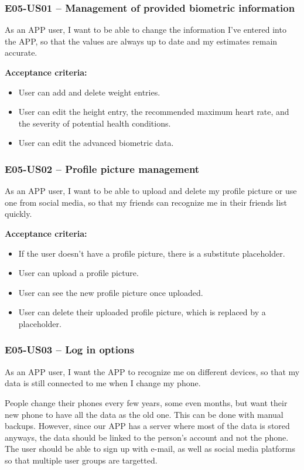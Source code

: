\subsubsection*{E05-US01 -- Management of provided biometric information}
As an APP user, I want to be able to change the information I've entered into the APP, so that the values are always up to date and my estimates remain accurate.

\textbf{Acceptance criteria:}
\begin{itemize}
    \item User can add and delete weight entries.
    \item User can edit the height entry, the recommended maximum heart rate, and the severity of potential health conditions.
    \item User can edit the advanced biometric data.
\end{itemize}

\subsubsection*{E05-US02 -- Profile picture management}
As an APP user, I want to be able to upload and delete my profile picture or use one from social media, so that my friends can recognize me in their friends list quickly.

\textbf{Acceptance criteria:}
\begin{itemize}
    \item If the user doesn't have a profile picture, there is a substitute placeholder.
    \item User can upload a profile picture.
    \item User can see the new profile picture once uploaded.
    \item User can delete their uploaded profile picture, which is replaced by a placeholder.
\end{itemize}

\subsubsection*{E05-US03 -- Log in options}
As an APP user, I want the APP to recognize me on different devices, so that my data is still connected to me when I change my phone.

People change their phones every few years, some even months, but want their new phone to have all the data as the old one.
This can be done with manual backups.
However, since our APP has a server where most of the data is stored anyways, the data should be linked to the person's account and not the phone.
The user should be able to sign up with e-mail, as well as social media platforms so that multiple user groups are targetted.

